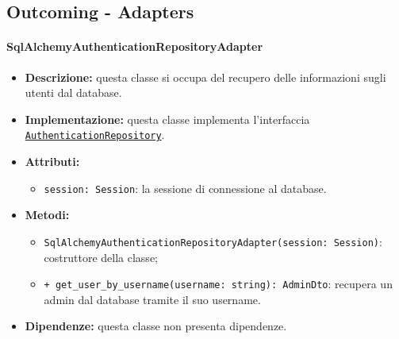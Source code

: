 \subsection{Outcoming - Adapters}

\paragraph{SqlAlchemyAuthenticationRepositoryAdapter} \label{SqlAlchemyAuthenticationRepositoryAdapter}
\begin{itemize}
    \item \textbf{Descrizione:} questa classe si occupa del recupero delle informazioni sugli utenti dal database.
    \item \textbf{Implementazione:} questa classe implementa l'interfaccia \hyperref[AuthenticationRepository]{\texttt{AuthenticationRepository}}.
    \item \textbf{Attributi:}
    \begin{itemize}
        \item \texttt{session: Session}: la sessione di connessione al database.
    \end{itemize}
    \item \textbf{Metodi:}
    \begin{itemize}
        \item \texttt{SqlAlchemyAuthenticationRepositoryAdapter(session: Session)}: costruttore della classe;
        \item \texttt{+ get\_user\_by\_username(username: string): AdminDto}: recupera un admin dal database tramite il suo username.
    \end{itemize}
    \item \textbf{Dipendenze:} questa classe non presenta dipendenze.
\end{itemize} 

